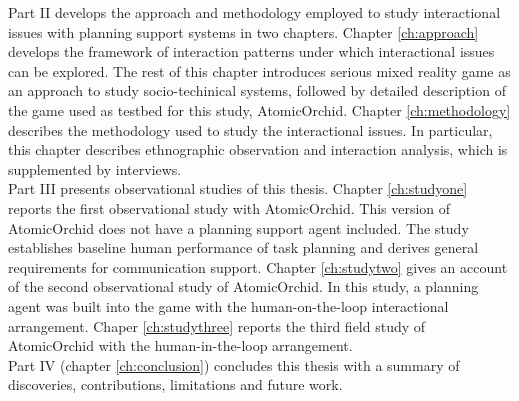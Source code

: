 Part II develops the approach and methodology employed to study interactional issues with planning support systems in two chapters. Chapter \ref{ch:approach} develops the framework of interaction patterns under which interactional issues can be explored. The rest of this chapter introduces serious mixed reality game as an approach to study socio-techinical systems, followed by detailed description of the game used as testbed for this study, AtomicOrchid. Chapter \ref{ch:methodology} describes the methodology used to study the interactional issues. In particular, this chapter describes ethnographic observation and interaction analysis, which is supplemented by interviews. \\ 

Part III presents observational studies of this thesis. Chapter \ref{ch:studyone} reports the first observational study with AtomicOrchid. This version of AtomicOrchid does not have a planning support agent included. The study establishes baseline human performance of task planning and derives general requirements for communication support. Chapter \ref{ch:studytwo} gives an account of the second observational study of AtomicOrchid. In this study, a planning agent was built into the game with the human-on-the-loop interactional arrangement. Chaper \ref{ch:studythree} reports the third field study of AtomicOrchid with the human-in-the-loop arrangement. \\ 

Part IV (chapter \ref{ch:conclusion}) concludes this thesis with a summary of discoveries, contributions, limitations and future work.\\









